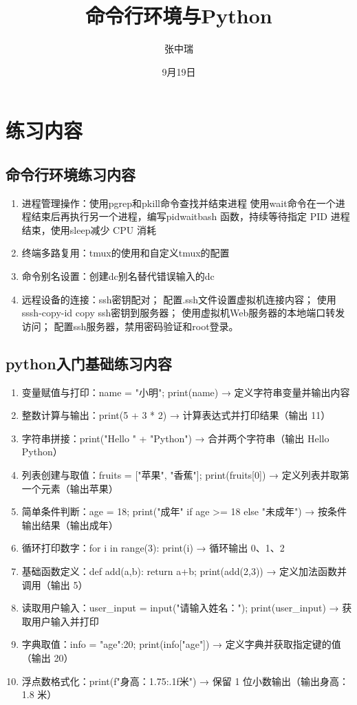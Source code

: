 \documentclass[10.5pt]{ctexart}
\title{命令行环境与Python}
\author{张中瑞}
\date{9月19日}
\begin{document}
\maketitle

\section{练习内容}
\subsection{命令行环境练习内容}
\begin{enumerate}
    \item 进程管理操作：使用pgrep和pkill命令查找并结束进程
    使用wait命令在一个进程结束后再执行另一个进程，编写pidwaitbash 函数，持续等待指定 PID 进程结束，使用sleep减少 CPU 消耗
    \item 终端多路复用：tmux的使用和自定义tmux的配置
    \item 命令别名设置：创建dc别名替代错误输入的dc
    \item 远程设备的连接：ssh密钥配对；
    配置.ssh文件设置虚拟机连接内容；
    使用sssh-copy-id copy ssh密钥到服务器；
    使用虚拟机Web服务器的本地端口转发访问；
    配置ssh服务器，禁用密码验证和root登录。
    \end{enumerate}
\subsection{python入门基础练习内容}
\begin{enumerate} 
    \item 变量赋值与打印：name = "小明"; print(name) → 定义字符串变量并输出内容
    \item 整数计算与输出：print(5 + 3 * 2) → 计算表达式并打印结果（输出 11）
    \item 字符串拼接：print("Hello " + "Python") → 合并两个字符串（输出 Hello Python）
    \item 列表创建与取值：fruits = ["苹果", "香蕉"]; print(fruits[0]) → 定义列表并取第一个元素（输出苹果）
    \item 简单条件判断：age = 18; print("成年" if age >= 18 else "未成年") → 按条件输出结果（输出成年）
    \item 循环打印数字：for i in range(3): print(i) → 循环输出 0、1、2
    \item 基础函数定义：def add(a,b): return a+b; print(add(2,3)) → 定义加法函数并调用（输出 5）
    \item 读取用户输入：user_input = input("请输入姓名："); print(user_input) → 获取用户输入并打印
    \item 字典取值：info = {"age":20}; print(info["age"]) → 定义字典并获取指定键的值（输出 20）
    \item 浮点数格式化：print(f"身高：{1.75:.1f}米") → 保留 1 位小数输出（输出身高：1.8 米）
\end{enumerate}
\end{document}
